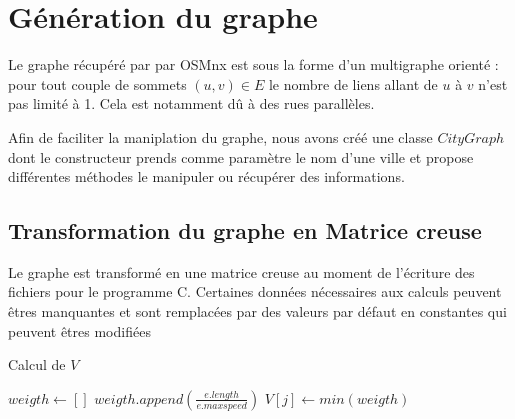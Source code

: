 \section{Génération du graphe}\label{sec:graphe}
	Le graphe récupéré par par OSMnx est sous la forme d'un multigraphe orienté : pour tout couple de sommets $(u,v)\in E$ le nombre de liens allant de $u$ à $v$ n'est pas limité à 1. Cela est notamment dû à des rues parallèles.
	
	Afin de faciliter la maniplation du graphe, nous avons créé une classe $CityGraph$ dont le constructeur prends comme paramètre le nom d'une ville et propose différentes méthodes le manipuler ou récupérer des informations.

\subsection{Transformation du graphe en Matrice creuse}
	Le graphe est transformé en une matrice creuse au moment de l'écriture des fichiers pour le programme C. Certaines données nécessaires aux calculs peuvent êtres manquantes et sont remplacées par des valeurs par défaut en constantes qui peuvent êtres modifiées
	
\begin{algorithm}
\caption{Calcul de $V$}
\begin{algorithmic}
			\State $weigth \gets []$
				\State $weigth.append\left(\frac{e.length}{e.maxspeed}\right)$
			\EndFor
			\State $V[j]\gets min(weigth)$
		\EndFor
	\EndFor
\end{algorithmic}
\end{algorithm}